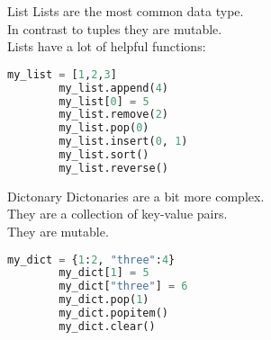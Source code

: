 \documentclass{beamer}
\begin{document}
\begin{frame}[fragile]{List}
    Lists are the most common data type.\\\pause
    In contrast to tuples they are mutable.\\\pause
    Lists have a lot of helpful functions:\\
    \begin{lstlisting}[backgroundcolor = \color{lightgray},language=Python]
        my_list = [1,2,3]
        my_list.append(4)
        my_list[0] = 5
        my_list.remove(2)
        my_list.pop(0)
        my_list.insert(0, 1)
        my_list.sort()
        my_list.reverse()
    \end{lstlisting}

\end{frame}

\begin{frame}[fragile]{Dictonary}
    Dictonaries are a bit more complex.\\\pause
    They are a collection of key-value pairs.\\\pause
    They are mutable.\\\pause
    \begin{lstlisting}[backgroundcolor = \color{lightgray},language=Python]
        my_dict = {1:2, "three":4}
        my_dict[1] = 5
        my_dict["three"] = 6
        my_dict.pop(1)
        my_dict.popitem()
        my_dict.clear()
    \end{lstlisting}
\end{frame}
\end{document}
